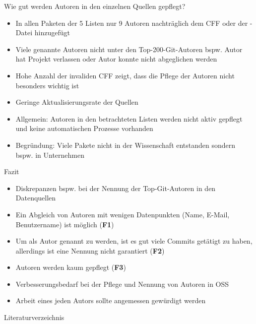 \documentclass[%
    handout,
    aspectratio=1610,
    10pt,
    onlytextwidth, %
]{beamer}
\begin{document}
\begin{frame}{Wie gut werden Autoren in den einzelnen Quellen gepflegt?}
    \begin{itemize}
        \item In allen Paketen der 5 Listen nur 9 Autoren nachträglich dem CFF oder der -Datei hinzugefügt
        \item Viele genannte Autoren nicht unter den Top-200-Git-Autoren bspw. Autor hat Projekt verlassen oder Autor konnte nicht abgeglichen werden
        \item Hohe Anzahl der invaliden CFF zeigt, dass die Pflege der Autoren nicht besonders wichtig ist
        \item Geringe Aktualisierungsrate der Quellen
        \item Allgemein: Autoren in den betrachteten Listen werden nicht aktiv gepflegt und keine automatischen Prozesse vorhanden
        \item Begründung: Viele Pakete nicht in der Wissenschaft entstanden sondern bspw. in Unternehmen %
    \end{itemize}
\end{frame}

\begin{frame}{Fazit}
    \begin{itemize}
        \item Diskrepanzen bspw. bei der Nennung der Top-Git-Autoren in den Datenquellen
        \item Ein Abgleich von Autoren mit wenigen Datenpunkten (Name, E-Mail, Benutzername) ist möglich (\textcolor{links}{\textbf{F1}})
        \item Um als Autor genannt zu werden, ist es gut viele Commits getätigt zu haben, allerdings ist eine Nennung nicht garantiert (\textcolor{links}{\textbf{F2}})
        \item Autoren werden kaum gepflegt (\textcolor{links}{\textbf{F3}})
        \item Verbesserungsbedarf bei der Pflege und Nennung von Autoren in OSS
        \item Arbeit eines jeden Autors sollte angemessen gewürdigt werden
    \end{itemize}
\end{frame}

\begin{frame}{Literaturverzeichnis}
    \printbibliography
\end{frame}

\end{document}
